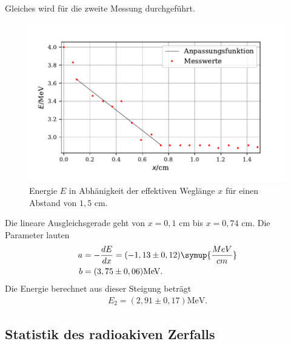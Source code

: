 Gleiches wird für die zweite Messung durchgeführt. 
\begin{figure}[H]
  \centering
  \includegraphics{plot4.pdf}
  \caption{Energie $E$ in Abhänigkeit der effektiven Weglänge $x$ für einen Abstand von $1,5$ $\si{\cm}$. }
  \label{fig:plot}
\end{figure}
Die lineare Ausgleichsgerade geht von $x=0,1$ $\si{\cm}$ bis $x=0,74$ $\si{\cm}$. Die Parameter lauten
\begin{align*}
a &= -\frac{dE}{dx} = (-1,13 \pm 0,12) \symup{\frac{MeV}{cm}} \\
b &= (3,75 \pm 0,06) \si{\MeV}.
\end{align*}
Die Energie berechnet aus dieser Steigung beträgt
\begin{align*}
E_2 = (2,91 \pm 0,17) \si{\MeV}.
\end{align*}



\subsection{Statistik des radioakiven Zerfalls}

